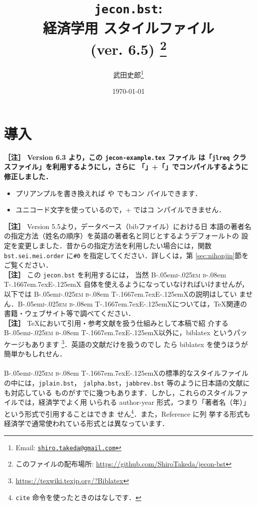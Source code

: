 \documentclass[article]{jlreq}
\title{\texttt{jecon.bst}:\\ 経済学用 \BibTeX{} スタイルファイル\\ (ver. 6.5)
\thanks{このファイルの配布場所: \url{https://github.com/ShiroTakeda/jecon-bst}}
}
\author{武田史郎\thanks{Email: \texttt{\href{mailto:shiro.takeda@gmail.com}{shiro.takeda@gmail.com}}}}
\date{\today}
\newcommand{\BibTeX}{\textrm{B\kern-.05em\textsc{i\kern-.025em b}\kern-.08em%
T\kern-.1667em\lower.7ex\hbox{E}\kern-.125emX}}
\newcommand{\midashii}[1]{\noindent \textbf{［#1］}}
\begin{document}
\maketitle

\tableofcontents


\section{導入}

\midashii{注} \textbf{Version 6.3 より，この \texttt{jecon-example.tex} ファイル
は「\texttt{jlreq} クラスファイル」を利用するようにし，さらに
「\LuaLaTeX」+「\upBibTeX」でコンパイルするように修正しました．}
\begin{itemize}
 \item プリアンプルを書き換えれば \upLaTeX や \XeLaTeX でもコン
       パイルできます．
 \item ユニコード文字を使っているので，\pLaTeX + \pBibTeX ではコ
       ンパイルできません．
\end{itemize}
\vspace*{1em}

\midashii{注} Version 5.5より，データベース（bibファイル）における日
本語の著者名の指定方法（姓名の順序）を英語の著者名と同じとするようデフォールトの
設定を変更しました．昔からの指定方法を利用したい場合には，関数
\texttt{bst.sei.mei.order} に\verb|#0| を指定してください．詳しくは，第
\ref{sec:nihonjin}節をご覧ください．
\\

\midashii{注} この \texttt{jecon.bst} を利用するには， 当然 \BibTeX
自体を使えるようになっていなければいけませんが，以下では \BibTeX の説明はしてい
ません．\BibTeX については，\TeX 関連の書籍・ウェブサイト等で調べてください．\\

\midashii{注} \TeX において引用・参考文献を扱う仕組みとして本稿で紹
介する \BibTeX 以外に，biblatex というパッケージもあります
\footnote{\url{https://texwiki.texjp.org/?Biblatex}}．英語の文献だけを扱うのでし
たら biblatex を使うほうが簡単かもしれせん．
\\
\\

\BibTeX の標準的なスタイルファイルの中には，\texttt{jplain.bst}，
\texttt{jalpha.bst}，\texttt{jabbrev.bst} 等のように日本語の文献にも対応している
ものがすでに幾つもあります．しかし，これらのスタイルファイルでは，経済学でよく用
いられる author-year 形式，つまり「著者名（年）」という形式で引用することはできま
せん\footnote{\texttt{cite} 命令を使ったときのはなしです．}．また，Reference に列
挙する形式も経済学で通常使われている形式とは異なっています．
\end{document}
